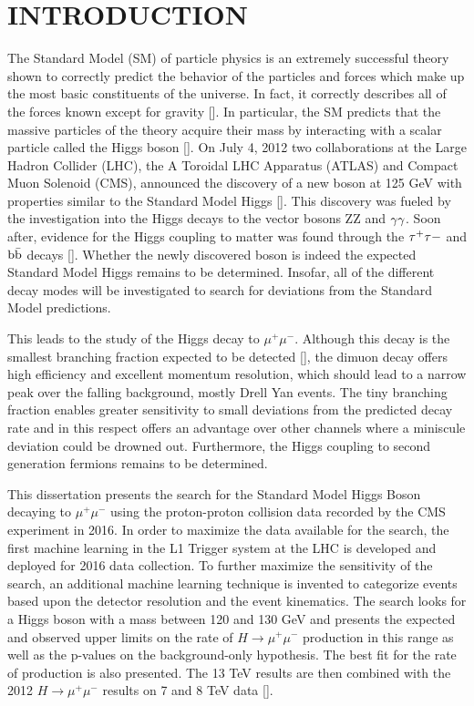 \chapter{INTRODUCTION} \label{intro}

The Standard Model (SM) of particle physics is an extremely successful theory shown to correctly predict the behavior of the particles and forces which make up the most basic constituents of the universe. In fact, it correctly describes all of the forces known except for gravity [\cite{smnograv}]. In particular, the SM predicts that the massive particles of the theory acquire their mass by interacting with a scalar particle called the Higgs boson [\cite{higgs1,higgs2,higgs3,qftam}]. On July 4, 2012 two collaborations at the Large Hadron Collider (LHC), the A Toroidal LHC Apparatus (ATLAS) and Compact Muon Solenoid (CMS), announced the discovery of a new boson at 125 GeV with properties similar to the Standard Model Higgs [\cite{atlasdiscovery,cmsdiscovery2012,cmsdiscovery2013}]. This discovery was fueled by the investigation into the Higgs decays to the vector bosons ZZ and ${\rm \gamma\gamma}$. Soon after, evidence for the Higgs coupling to matter was found through the ${\rm \tau^{+}\tau{-}}$ and ${\rm b\bar{b}}$ decays [\cite{cmshiggstau,cmshiggsbb,cmshiggsferm,atlashiggsbb}]. Whether the newly discovered boson is indeed the expected Standard Model Higgs remains to be determined. Insofar, all of the different decay modes will be investigated to search for deviations from the Standard Model predictions.

This leads to the study of the Higgs decay to $\mu^{+}\mu^{-}$. Although this decay is the smallest branching fraction expected to be detected [\cite{smallestbranch1,smallestbranch2}], the dimuon decay offers high efficiency and excellent momentum resolution, which should lead to a narrow peak over the falling background, mostly Drell Yan events. The tiny branching fraction enables greater sensitivity to small deviations from the predicted decay rate and in this respect offers an advantage over other channels where a miniscule deviation could be drowned out. Furthermore, the Higgs coupling to second generation fermions remains to be determined. 

This dissertation presents the search for the Standard Model Higgs Boson decaying to $\mu^{+}\mu^{-}$ using the proton-proton collision data recorded by the CMS experiment in 2016. In order to maximize the data available for the search, the first machine learning in the L1 Trigger system at the LHC is developed and deployed for 2016 data collection. To further maximize the sensitivity of the search, an additional machine learning technique is invented to categorize events based upon the detector resolution and the event kinematics. The search looks for a Higgs boson with a mass between 120 and 130 GeV and presents the expected and observed upper limits on the rate of $H\rightarrow\mu^+\mu^-$ production in this range as well as the p-values on the background-only hypothesis. The best fit for the rate of production is also presented. The 13 TeV results are then combined with the 2012 $H\rightarrow\mu^+\mu^-$ results on 7 and 8 TeV data [\cite{cmshiggsmumu2012}].  

